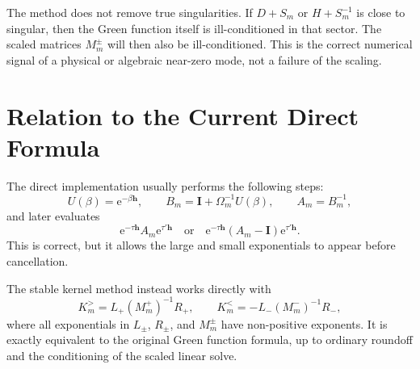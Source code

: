 \documentclass[11pt]{article}
\newcommand{\e}{\mathrm{e}}
\newcommand{\1}{\mathbb{1}}
\newcommand{\bI}{\mathbf{I}}
\newcommand{\bh}{\mathbf{h}}
\begin{document}
The method does not remove true singularities.  If \(D+S_m\) or
\(H+S_m^{-1}\) is close to singular, then the Green function itself is
ill-conditioned in that sector.  The scaled matrices \(M_m^\pm\) will then
also be ill-conditioned.  This is the correct numerical signal of a physical
or algebraic near-zero mode, not a failure of the scaling.

\section{Relation to the Current Direct Formula}

The direct implementation usually performs the following steps:
\[
    U(\beta)=\e^{-\beta\bh},
    \qquad
    B_m=\bI+\Omega_m^{-1}U(\beta),
    \qquad
    A_m=B_m^{-1},
\]
and later evaluates
\[
    \e^{-\tau\bh}A_m\e^{\tau'\bh}
    \quad\text{or}\quad
    \e^{-\tau\bh}(A_m-\bI)\e^{\tau'\bh}.
\]
This is correct, but it allows the large and small exponentials to appear
before cancellation.

The stable kernel method instead works directly with
\[
    K_m^> =
    L_+(M_m^+)^{-1}R_+,
    \qquad
    K_m^< =
    -L_-(M_m^-)^{-1}R_-,
\]
where all exponentials in \(L_\pm\), \(R_\pm\), and \(M_m^\pm\) have
non-positive exponents.  It is exactly equivalent to the original Green
function formula, up to ordinary roundoff and the conditioning of the scaled
linear solve.
\end{document}
